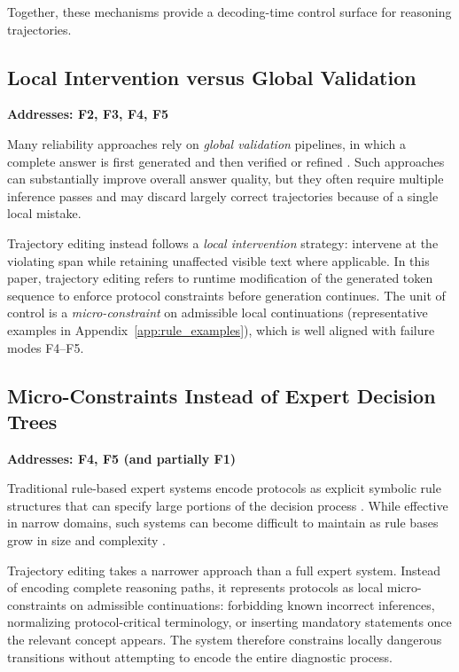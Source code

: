 \documentclass[twocolumn]{article}
\begin{document}
Together, these mechanisms provide a decoding-time control surface for reasoning
trajectories.

\subsection{Local Intervention versus Global Validation}
\textbf{Addresses: F2, F3, F4, F5}

Many reliability approaches rely on \emph{global validation} pipelines, in which
a complete answer is first generated and then verified or refined
\parencite{madaan2023selfrefine,shinn2023reflexion,
gou2024critic,miao2024selfcheck}. Such approaches can substantially improve
overall answer quality, but they often require multiple inference passes and may
discard largely correct trajectories because of a single local mistake.

Trajectory editing instead follows a \emph{local intervention} strategy:
intervene at the violating span while retaining unaffected visible text where
applicable. In this paper, trajectory editing refers to runtime modification of
the generated token sequence to enforce protocol constraints before generation
continues. The unit of control is a \emph{micro-constraint} on admissible local
continuations (representative examples in Appendix~\ref{app:rule_examples}),
which is well aligned with failure modes F4--F5.

\subsection{Micro-Constraints Instead of Expert Decision Trees}
\textbf{Addresses: F4, F5 (and partially F1)}

Traditional rule-based expert systems encode protocols as explicit symbolic rule
structures that can specify large portions of the decision process
\parencite{reddy2022rbes}. While effective in narrow domains, such systems can
become difficult to maintain as rule bases grow in size and complexity
\parencite{chen1994complexity,higa1996maintainability}.

Trajectory editing takes a narrower approach than a full expert system. Instead
of encoding complete reasoning paths, it represents protocols as local
micro-constraints on admissible continuations: forbidding known incorrect
inferences, normalizing protocol-critical terminology, or inserting mandatory
statements once the relevant concept appears. The system therefore constrains
locally dangerous transitions without attempting to encode the entire diagnostic
process.
\end{document}
